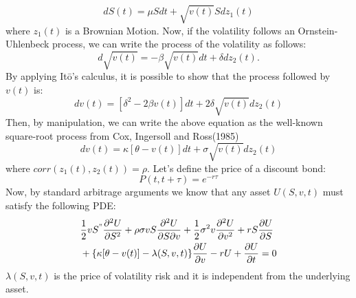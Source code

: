 \documentclass[paper=a4, fontsize=12pt]{scrartcl} %
\numberwithin{equation}{section}
\begin{document}
	\begin{equation}
		dS(t) = \mu S dt + \sqrt{v(t)} S dz_1(t)
	\end{equation}
where $z_1(t)$ is a Brownian Motion. Now, if the volatility follows an Ornstein-Uhlenbeck process, we can write the process of the volatility as follows:
	\begin{equation}
		d \sqrt{v(t)} = -\beta \sqrt{v(t)} dt + \delta dz_2(t).
	\end{equation}
By applying It\={o}'s calculus, it is possible to show that the process followed by $v(t)$ is:
	\begin{equation}
		dv(t) = [\delta^2 - 2 \beta v(t)]dt + 2 \delta \sqrt{v(t)} dz_2(t)
	\end{equation}
Then, by manipulation, we can write the above equation as the well-known square-root process from Cox, Ingersoll and Ross(1985) \cite{cir} 
	\begin{equation}
		dv(t) = \kappa[\theta - v(t)] dt + \sigma \sqrt{v(t)}dz_2(t)
	\end{equation}
where $corr(z_1(t), z_2(t)) = \rho$.
Let's define the price of a discount bond:
	\begin{equation}
		P(t, t+\tau) = e^{-r \tau}
	\end{equation}
Now, by standard arbitrage arguments \cite{black-scholes73} we know that any asset $U(S, v, t)$ must satisfy the following PDE:
	\begin{equation}
	\begin{aligned}
		& \frac{1}{2} vS^" \frac{\partial^2 U}{\partial S^2} + \rho \sigma vS \frac{\partial^2 U}{\partial S \partial v} + \frac{1}{2}  \sigma^2 v  \frac{\partial^2 U}{\partial v^2} + rS \frac{\partial U}{\partial S}  \\	
		& +\{ \kappa [\theta - v(t)] - \lambda(S, v, t) \} \frac{\partial U}{\partial v} - rU +  \frac{\partial U}{\partial t} = 0
	\end{aligned}
	\end{equation}
$\lambda(S, v, t)$ is the price of volatility risk and it is independent from the underlying asset. \par
\end{document}
